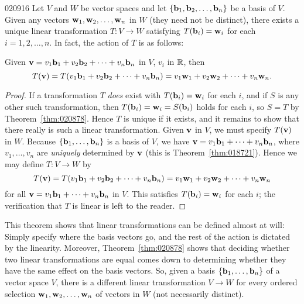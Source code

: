 \begin{theorem}{}{020916}
Let $V$ and $W$ be vector spaces and let $\{\textbf{b}_{1}, \textbf{b}_{2}, \dots, \textbf{b}_{n}\}$ be a basis of $V$. Given any vectors $\textbf{w}_{1}, \textbf{w}_{2}, \dots, \textbf{w}_{n}$ in $W$ (they need not be distinct), there exists a unique linear transformation $T : V \to W$ satisfying $T(\textbf{b}_{i}) = \textbf{w}_{i}$ for each $i = 1, 2, \dots, n$. In fact, the action of $T$ is as follows:


Given $\textbf{v} = v_{1}\textbf{b}_{1} + v_{2}\textbf{b}_{2} + \cdots + v_{n}\textbf{b}_{n}$ in $V$, $v_{i}$ in $\mathbb{R}$, then
\begin{equation*}
T(\textbf{v}) = T(v_1\textbf{b}_1 + v_2\textbf{b}_2 + \cdots + v_n\textbf{b}_n) = v_1\textbf{w}_1 + v_2\textbf{w}_2 + \cdots + v_n\textbf{w}_n.
\end{equation*}
\end{theorem}

\begin{proof}
If a transformation $T$ \textit{does} exist with $T(\textbf{b}_{i}) = \textbf{w}_{i}$ for each $i$, and if $S$ is any other such transformation, then $T(\textbf{b}_{i}) = \textbf{w}_{i} = S(\textbf{b}_{i})$ holds for each $i$, so $S = T$ by Theorem~\ref{thm:020878}. Hence $T$ is unique if it exists, and it remains to show that there really is such a linear transformation. Given $\textbf{v}$ in $V$, we must specify $T(\textbf{v})$ in $W$. Because $\{\textbf{b}_{1}, \dots, \textbf{b}_{n}\}$ is a basis of $V$, we have $\textbf{v} = v_{1}\textbf{b}_{1} + \dots + v_{n}\textbf{b}_{n}$, where $v_{1}, \dots, v_{n}$ are \textit{uniquely} determined by $\textbf{v}$ (this is Theorem~\ref{thm:018721}). Hence we may define $T : V \to W$ by
\begin{equation*}
T(\textbf{v}) = T(v_1\textbf{b}_1 + v_2\textbf{b}_2 + \cdots + v_n\textbf{b}_n) = v_1\textbf{w}_1 + v_2\textbf{w}_2 + \cdots + v_n\textbf{w}_n
\end{equation*}
for all $\textbf{v} = v_{1}\textbf{b}_{1} + \dots + v_{n}\textbf{b}_{n}$ in $V$. This satisfies $T(\textbf{b}_{i}) = \textbf{w}_{i}$ for each $i$; the verification that $T$ is linear is left to the reader.
\end{proof}

This theorem shows that linear transformations can be defined almost at will: Simply specify where the basis vectors go, and the rest of the action is dictated by the linearity. Moreover, Theorem~\ref{thm:020878} shows that deciding whether two linear transformations are equal comes down to determining whether they have the same effect on the basis vectors. So, given a basis $\{\textbf{b}_{1}, \dots, \textbf{b}_{n}\}$ of a vector space $V$, there is a different linear transformation $V \to W$ for every ordered selection $\textbf{w}_{1}, \textbf{w}_{2}, \dots, \textbf{w}_{n}$ of vectors in $W$ (not necessarily distinct).


